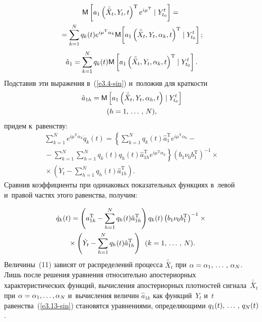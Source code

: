 \begin{multicols}{2}
    \vspace*{-12pt}
    
    \noindent
    \begin{multline}
    \mathsf{M}\left[ a_1 \left(\bar{\bar X}_t,Y_t,t\right)^{\mathrm{T}} e^{i\mu^{\mathrm{T}}}\mid Y_{t_0}^t\right]={}\\
    \!\!{}= \sum\limits_{k=1}^N q_k (t)e^{i\mu^{\mathrm{T}}\alpha_k}\mathsf{M}\!\left[ a_1 \left(\bar{\bar X}_t,Y_t,\alpha_k,t\right)^{\mathrm{T}} \mid
    Y_{t_0}^t\right];\!\!
    \label{e3.9-sin}
    \end{multline}
     \begin{equation}
     \hat a_1 =\sum\limits_{k=1}^N q_k(t) \mathsf{M}\left[ a_1 \left(\bar{\bar X}_t,Y_t,\alpha_k,t\right)^{\mathrm{T}} \mid
    Y_{t_0}^t\right].\label{e3.10-sin}
    \end{equation}
 Подставив эти выражения в~(\ref{e3.4-sin}) и~положив для
 краткости
        \begin{multline}
        \hat a_{1h} =\mathsf{M}\left[ a_1 \left(\bar{\bar X}_t,Y_t,\alpha_h,t\right) \mid
    Y_{t_0}^t\right]\\
     (h=1,\,\ldots\,,\, N),
     \label{e3.11-sin}
    \end{multline}
придем к~равенству:
    \begin{multline}
    \sum\limits_{k=1}^N e^{i\mu^{\mathrm{T}}\alpha_k}\dot q_k (t) = 
    \left\{ \sum\limits_{k=1}^N q_k (t)\hat a_1^{\mathrm{T}}
    e^{i\mu^{\mathrm{T}}\alpha_k}-{}\right.\\
\left.{}-\sum\limits_{k=1}^N \sum\limits_{h=1}^N q_k (t)q_h(t) \hat a_{1h}^{\mathrm{T}} e^{i\mu^{\mathrm{T}}\alpha_k}\right\}
    \left(b_1\nu_0 b_1^{\mathrm{T}}\right)^{-1}\times{}\\
    {}\times \left( \dot Y_t -
    \sum\limits_{h=1}^N q_h (t)\hat a_{1h}^{\mathrm{T}} \right).
    \label{e3.12-sin}
\end{multline}
Сравнив коэффициенты при одинаковых показательных функциях в~левой
и~правой частях этого равенства, получим:

\noindent
  \begin{multline}
  \dot q_k (t) = \left( a_{1k}^{\mathrm{T}} -
    \sum\limits_{h=1}^N q_h (t)\hat a_{1h}^{\mathrm{T}} \right) q_k (t)
    \left(b_1\nu_0 b_1^{\mathrm{T}}\right)^{-1}\times{}\\
    {}\times \left( \dot Y_t -
    \sum\limits_{h=1}^N q_h (t)\hat a_{1h}^{\mathrm{T}} \right)\enskip
    (k=1,\,\ldots\,,\, N).
    \label{e3.13-sin}
    \end{multline}
Величины~(11)
зависят от  распределений процесса $\bar{\bar X}_t$ при  $\alpha\hm =\alpha_1\tr
\alpha_N$. Лишь после решения уравнения  относительно
апостериорных характеристических функций, вычисления апостериорных плотностей 
сигнала~$\bar{\bar X}_t$ при $\alpha \hm=\alpha_1,\ldots, \alp_N$ и~вычисления величин
$\hat a_{1k}$ как функций~$Y_t$ и~$t$ равенства~(\ref{e3.13-sin})
становятся уравнениями, определяющими $q_1 (t),\,\ldots\,,\, q_N(t)$.


\end{multicols}
